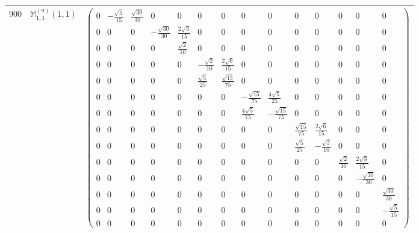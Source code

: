 \documentclass[fleqn,8pt,landscape]{jsarticle}
\begin{document}
\begin{center}
\begin{longtable}{ccc}
$ 900 $ & $ \mathbb{M}_{1,1}^{(a)}(1,1) $ & $ \begin{pmatrix} 0 & - \frac{\sqrt{5}}{15} & \frac{\sqrt{30}}{30} & 0 & 0 & 0 & 0 & 0 & 0 & 0 & 0 & 0 & 0 & 0 \\ 0 & 0 & 0 & - \frac{\sqrt{30}}{30} & \frac{2 \sqrt{3}}{15} & 0 & 0 & 0 & 0 & 0 & 0 & 0 & 0 & 0 \\ 0 & 0 & 0 & 0 & \frac{\sqrt{2}}{10} & 0 & 0 & 0 & 0 & 0 & 0 & 0 & 0 & 0 \\ 0 & 0 & 0 & 0 & 0 & - \frac{\sqrt{2}}{10} & \frac{2 \sqrt{6}}{15} & 0 & 0 & 0 & 0 & 0 & 0 & 0 \\ 0 & 0 & 0 & 0 & 0 & \frac{\sqrt{5}}{25} & \frac{\sqrt{15}}{75} & 0 & 0 & 0 & 0 & 0 & 0 & 0 \\ 0 & 0 & 0 & 0 & 0 & 0 & 0 & - \frac{\sqrt{15}}{75} & \frac{4 \sqrt{5}}{25} & 0 & 0 & 0 & 0 & 0 \\ 0 & 0 & 0 & 0 & 0 & 0 & 0 & \frac{4 \sqrt{5}}{75} & - \frac{\sqrt{15}}{75} & 0 & 0 & 0 & 0 & 0 \\ 0 & 0 & 0 & 0 & 0 & 0 & 0 & 0 & 0 & \frac{\sqrt{15}}{75} & \frac{2 \sqrt{6}}{15} & 0 & 0 & 0 \\ 0 & 0 & 0 & 0 & 0 & 0 & 0 & 0 & 0 & \frac{\sqrt{5}}{25} & - \frac{\sqrt{2}}{10} & 0 & 0 & 0 \\ 0 & 0 & 0 & 0 & 0 & 0 & 0 & 0 & 0 & 0 & 0 & \frac{\sqrt{2}}{10} & \frac{2 \sqrt{3}}{15} & 0 \\ 0 & 0 & 0 & 0 & 0 & 0 & 0 & 0 & 0 & 0 & 0 & 0 & - \frac{\sqrt{30}}{30} & 0 \\ 0 & 0 & 0 & 0 & 0 & 0 & 0 & 0 & 0 & 0 & 0 & 0 & 0 & \frac{\sqrt{30}}{30} \\ 0 & 0 & 0 & 0 & 0 & 0 & 0 & 0 & 0 & 0 & 0 & 0 & 0 & - \frac{\sqrt{5}}{15} \\ 0 & 0 & 0 & 0 & 0 & 0 & 0 & 0 & 0 & 0 & 0 & 0 & 0 & 0 \end{pmatrix} $ \\ \hline

\end{longtable}
\end{center}
\end{document}
